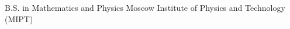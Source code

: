 
\begin{cventries}

  \cventry
    {B.S. in Mathematics and Physics}
    {Moscow Institute of Physics and Technology (MIPT)}
    {}
    {}
    {
      \begin{cvitems}
      \end{cvitems}
    }

\end{cventries}

